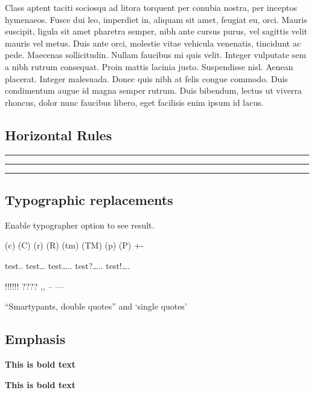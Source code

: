 \documentclass[]{article}
\begin{document}
Class aptent taciti sociosqu ad litora torquent per conubia nostra, per
inceptos hymenaeos. Fusce dui leo, imperdiet in, aliquam sit amet,
feugiat eu, orci. Mauris suscipit, ligula sit amet pharetra semper, nibh
ante cursus purus, vel sagittis velit mauris vel metus. Duis ante orci,
molestie vitae vehicula venenatis, tincidunt ac pede. Maecenas
sollicitudin. Nullam faucibus mi quis velit. Integer vulputate sem a
nibh rutrum consequat. Proin mattis lacinia justo. Suspendisse nisl.
Aenean placerat. Integer malesuada. Donec quis nibh at felis congue
commodo. Duis condimentum augue id magna semper rutrum. Duis bibendum,
lectus ut viverra rhoncus, dolor nunc faucibus libero, eget facilisis
enim ipsum id lacus.

\subsection{Horizontal Rules}\label{horizontal-rules}

\begin{center}\rule{0.5\linewidth}{\linethickness}\end{center}

\begin{center}\rule{0.5\linewidth}{\linethickness}\end{center}

\begin{center}\rule{0.5\linewidth}{\linethickness}\end{center}

\subsection{Typographic replacements}\label{typographic-replacements}

Enable typographer option to see result.

(c) (C) (r) (R) (tm) (TM) (p) (P) +-

test.. test\ldots{} test\ldots{}.. test?\ldots{}.. test!\ldots{}.

!!!!!! ???? ,, -- ---

``Smartypants, double quotes'' and `single quotes'

\subsection{Emphasis}\label{emphasis}

\textbf{This is bold text}

\textbf{This is bold text}
\end{document}
